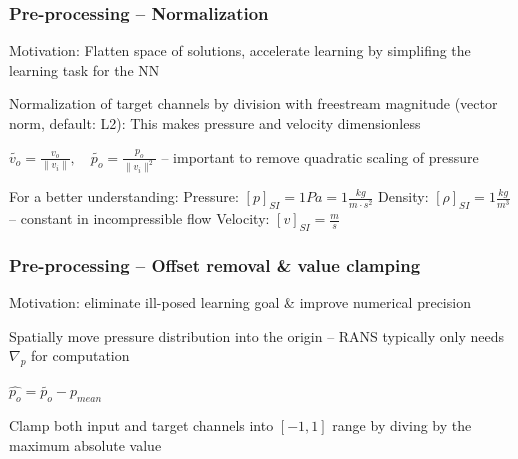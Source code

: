 \begin{frame}
    \frametitle{Pre-processing -- Normalization}
\vspace*{0.8cm}

Motivation: Flatten space of solutions, accelerate learning by simplifing the learning task for the NN

Normalization of target channels by division with freestream magnitude (vector norm, default: L2):\newline
This makes pressure and velocity dimensionless

$\tilde{v_{o}} = \frac{v_{o}}{\|v_{i}\|}, \quad \tilde{p_{o}} = \frac{p_{o}}{\|v_{i}\|^{2}}$ -- important to remove quadratic scaling of pressure

For a better understanding: \newline
Pressure: $[p]_{SI} = 1 Pa = 1 \frac{kg}{m \cdot s^2}$ \newline
Density: $[\rho]_{SI} = 1 \frac{kg}{m^3}$ -- constant in incompressible flow \newline
Velocity: $[v]_{SI} = \frac{m}{s}$ \newline

\end{frame}
\clearpage

\begin{frame}
    \frametitle{Pre-processing -- Offset removal \& value clamping}
\vspace*{0.8cm}
Motivation: eliminate ill-posed learning goal \& improve numerical precision

Spatially move pressure distribution into the origin -- RANS typically only needs $\nabla_{p}$ for computation

$\hat{p_o} = \tilde{p_o} - p_{mean}$    

Clamp both input and target channels into $[-1, 1]$ range by diving by the maximum absolute value

\end{frame}
\clearpage

